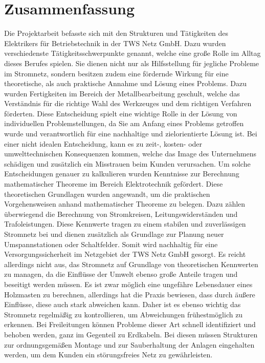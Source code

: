 \chapter{Zusammenfassung}
\label{cha:zusammenfassung}

Die Projektarbeit befasste sich mit den Strukturen und Tätigkeiten des Elektrikers für Betriebstechnik in der TWS Netz GmbH. Dazu wurden verschiedenste 
Tätigkeitsschwerpunkte genannt, welche eine große Rolle im Alltag dieses Berufes spielen. Sie dienen nicht nur als Hilfsstellung für jegliche Probleme
im Stromnetz, sondern besitzen zudem eine fördernde Wirkung für eine theoretische, als auch praktische Annahme und Lösung eines Problems. Dazu wurden 
Fertigkeiten im Bereich der Metallbearbeitung geschult, welche das Verständnis für die richtige Wahl des Werkzeuges und dem richtigen Verfahren förderten. 
Diese Entscheidung spielt eine wichtige Rolle in der Lösung von individuellen Problemstellungen, da Sie am Anfang eines Problems getroffen wurde und 
verantwortlich für eine nachhaltige und zielorientierte Lösung ist. Bei einer nicht idealen Entscheidung, kann es zu zeit-, kosten- oder umwelttechnischen 
Konsequenzen kommen, welche das Image des Unternehmens schädigen und zusätzlich ein Misstrauen beim Kunden verursachen. Um solche Entscheidungen genauer 
zu kalkulieren wurden Kenntnisse zur Berechnung mathematischer Theoreme im Bereich Elektrotechnik gefördert. Diese theoretischen Grundlagen wurden angewandt, 
um die praktischen Vorgehensweisen anhand mathematischer Theoreme zu belegen. Dazu zählen überwiegend die Berechnung von Stromkreisen, Leitungswiderständen 
und Trafoleistungen. Diese Kennwerte tragen zu einem stabilen und zuverlässigen Stromnetz bei und dienen zusätzlich als Grundlage zur Planung neuer 
Umspannstationen oder Schaltfelder. Somit wird nachhaltig für eine Versorgungssicherheit im Netzgebiet der TWS Netz GmbH gesorgt. Es reicht allerdings 
nicht aus, das Stromnetz auf Grundlage von theoretischen Kennwerten zu managen, da die Einflüsse der Umwelt ebenso große Anteile tragen und beseitigt 
werden müssen. Es ist zwar möglich eine ungefähre Lebensdauer \zB eines Holzmasten zu berechnen, allerdings hat die Praxis bewiesen, dass durch äußere 
Einflüsse, diese auch stark abweichen kann. Daher ist es ebenso wichtig das Stromnetz regelmäßig zu kontrollieren, um Abweichungen frühestmöglich zu 
erkennen. Bei Freileitungen können Probleme dieser Art schnell identifiziert und behoben werden, ganz im Gegenteil zu Erdkabeln. Bei diesen müssen 
Strukturen zur ordnungsgemäßen Montage und zur Sauberhaltung der Anlagen eingehalten werden, um dem Kunden ein störungsfreies Netz zu gewährleisten. 
